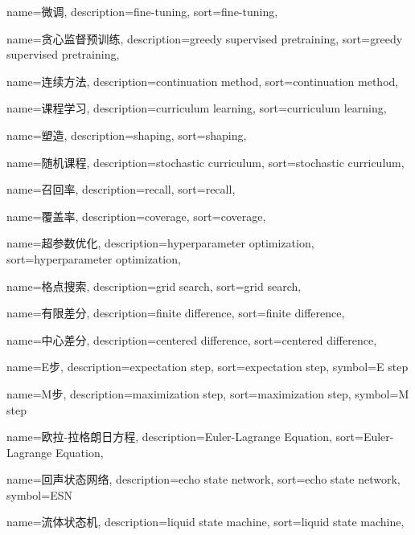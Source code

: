 {
  name=微调,
  description={fine-tuning},
  sort={fine-tuning},
}

{
  name=贪心监督预训练,
  description={greedy supervised pretraining},
  sort={greedy supervised pretraining},
}

{
  name=连续方法,
  description={continuation method},
  sort={continuation method},
}

{
  name=课程学习,
  description={curriculum learning},
  sort={curriculum learning},
}

{
  name=塑造, %
  description={shaping},
  sort={shaping},
}

{
  name=随机课程,
  description={stochastic curriculum},
  sort={stochastic curriculum},
}

{
  name=召回率,
  description={recall},
  sort={recall},
}

{
  name=覆盖率,
  description={coverage},
  sort={coverage},
}

{
  name=超参数优化,
  description={hyperparameter optimization},
  sort={hyperparameter optimization},
}

{
  name=格点搜索,
  description={grid search},
  sort={grid search},
}

{
  name=有限差分,
  description={finite difference},
  sort={finite difference},
}

{
  name=中心差分,
  description={centered difference},
  sort={centered difference},
}

{
  name=E步,
  description={expectation step},
  sort={expectation step},
  symbol={E step}
}

{
  name=M步,
  description={maximization step},
  sort={maximization step},
  symbol={M step}
}

{
  name=欧拉-拉格朗日方程,
  description={Euler-Lagrange Equation},
  sort={Euler-Lagrange Equation},
}

{
  name=回声状态网络,
  description={echo state network},
  sort={echo state network},
  symbol={ESN}
}

{
  name=流体状态机,
  description={liquid state machine},
  sort={liquid state machine},
}

